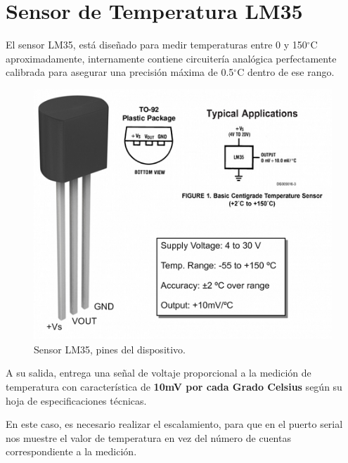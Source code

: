 \documentclass[letterpaper, 10pt]{report}
\begin{document}
\section{Sensor de Temperatura LM35}

El sensor LM35, está diseñado para medir temperaturas entre 0 y 150$^{\circ}$C aproximadamente, internamente contiene circuitería analógica perfectamente calibrada para asegurar una precisión máxima de 0.5$^{\circ}$C dentro de ese rango.

\begin{figure}[h]
\centering
\includegraphics[scale=0.55]{lm35.png}
\caption{Sensor LM35, pines del dispositivo. \label{LM35}}
\end{figure}

A su salida, entrega una señal de voltaje proporcional a la medición de temperatura con característica de {\bf 10mV por cada Grado Celsius} según su hoja de especificaciones técnicas. \cite{LM35}

En este caso, es necesario realizar el escalamiento, para que en el puerto serial nos muestre el valor de temperatura en vez del número de cuentas correspondiente a la medición.
\end{document}
